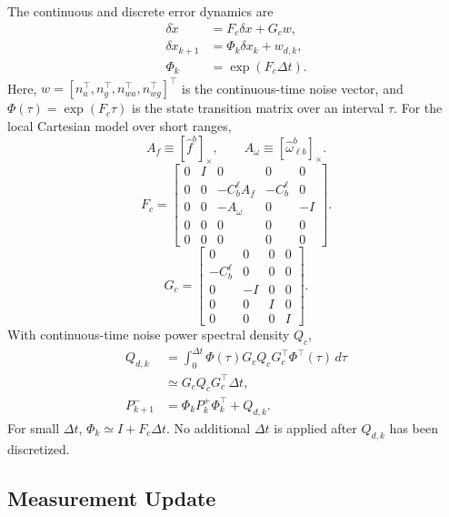 \documentclass[]{IAC_style}
\begin{document}
The continuous and discrete error dynamics are
\begin{equation}
\tag{22}\label{eq:22}
\begin{aligned}\delta\dot x&=F_c\delta x+G_cw,\\\delta x_{k+1}&=\Phi_k\delta x_k+w_{d,k},\\\Phi_k&=\exp(F_c\Delta t).\end{aligned}
\end{equation}
Here, $w=[n_a^\top,n_g^\top,n_{wa}^\top,n_{wg}^\top]^\top$ is the continuous-time noise vector, and $\Phi(\tau)=\exp(F_c\tau)$ is the state transition matrix over an interval $\tau$.
For the local Cartesian model over short ranges,
\begin{equation}
\tag{23a}\label{eq:23a}
A_f\equiv[\hat f^b]_\times,
\qquad
A_\omega\equiv[\hat\omega_{\ell b}^b]_\times.
\end{equation}
\begin{equation}
\tag{23b}\label{eq:23b}
F_c=
\begin{bmatrix}
0&I&0&0&0\\
0&0&-C_b^\ell A_f&-C_b^\ell&0\\
0&0&-A_\omega&0&-I\\
0&0&0&0&0\\
0&0&0&0&0
\end{bmatrix}.
\end{equation}
\begin{equation}
\tag{23c}\label{eq:23c}
G_c=
\begin{bmatrix}
0&0&0&0\\
-C_b^\ell&0&0&0\\
0&-I&0&0\\
0&0&I&0\\
0&0&0&I
\end{bmatrix}.
\end{equation}
With continuous-time noise power spectral density $Q_c$,
\begin{equation}
\tag{24}\label{eq:24}
\begin{aligned}Q_{d,k}&=\int_0^{\Delta t}\Phi(\tau)G_cQ_cG_c^\top\Phi^\top(\tau)\,d\tau\\&\simeq G_cQ_cG_c^\top\Delta t,\\P_{k+1}^-&=\Phi_kP_k^+\Phi_k^\top+Q_{d,k}.\end{aligned}
\end{equation}
For small $\Delta t$, $\Phi_k\simeq I+F_c\Delta t$. No additional $\Delta t$ is applied after $Q_{d,k}$ has been discretized.

\subsection{Measurement Update}
\end{document}
